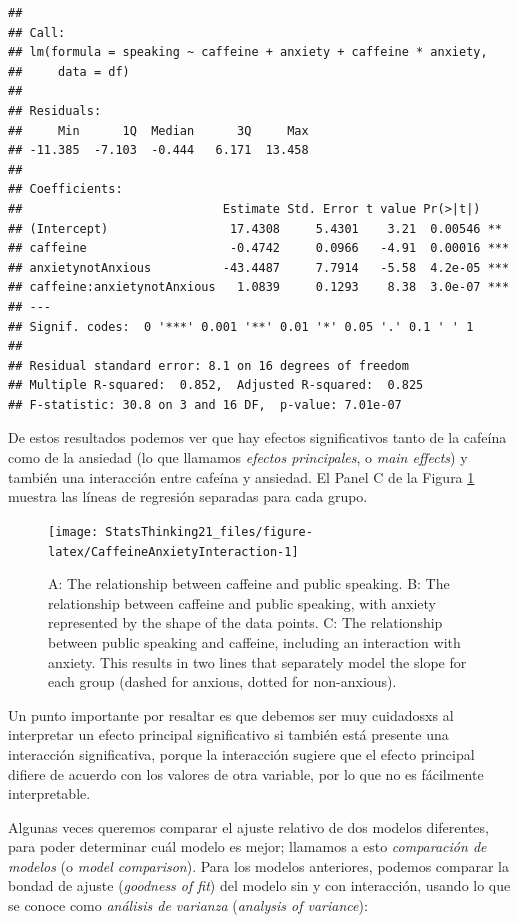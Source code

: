 \documentclass[
  12pt,
]{book}
\begin{document}
\begin{verbatim}
## 
## Call:
## lm(formula = speaking ~ caffeine + anxiety + caffeine * anxiety, 
##     data = df)
## 
## Residuals:
##     Min      1Q  Median      3Q     Max 
## -11.385  -7.103  -0.444   6.171  13.458 
## 
## Coefficients:
##                            Estimate Std. Error t value Pr(>|t|)    
## (Intercept)                 17.4308     5.4301    3.21  0.00546 ** 
## caffeine                    -0.4742     0.0966   -4.91  0.00016 ***
## anxietynotAnxious          -43.4487     7.7914   -5.58  4.2e-05 ***
## caffeine:anxietynotAnxious   1.0839     0.1293    8.38  3.0e-07 ***
## ---
## Signif. codes:  0 '***' 0.001 '**' 0.01 '*' 0.05 '.' 0.1 ' ' 1
## 
## Residual standard error: 8.1 on 16 degrees of freedom
## Multiple R-squared:  0.852,  Adjusted R-squared:  0.825 
## F-statistic: 30.8 on 3 and 16 DF,  p-value: 7.01e-07
\end{verbatim}

De estos resultados podemos ver que hay efectos significativos tanto de la cafeína como de la ansiedad (lo que llamamos \emph{efectos principales}, o \emph{main effects}) y también una interacción entre cafeína y ansiedad. El Panel C de la Figura \ref{fig:CaffeineAnxietyInteraction} muestra las líneas de regresión separadas para cada grupo.

\begin{figure}
\texttt{[image: StatsThinking21\_files/figure-latex/CaffeineAnxietyInteraction-1]} \caption{A: The relationship between caffeine and public speaking. B: The relationship between caffeine and public speaking, with anxiety represented by the shape of the data points. C: The relationship between public speaking and caffeine, including an interaction with anxiety.  This results in two lines that separately model the slope for each group (dashed for anxious, dotted for non-anxious).}\label{fig:CaffeineAnxietyInteraction}
\end{figure}

Un punto importante por resaltar es que debemos ser muy cuidadosxs al interpretar un efecto principal significativo si también está presente una interacción significativa, porque la interacción sugiere que el efecto principal difiere de acuerdo con los valores de otra variable, por lo que no es fácilmente interpretable.

Algunas veces queremos comparar el ajuste relativo de dos modelos diferentes, para poder determinar cuál modelo es mejor; llamamos a esto \emph{comparación de modelos} (o \emph{model comparison}). Para los modelos anteriores, podemos comparar la bondad de ajuste (\emph{goodness of fit}) del modelo sin y con interacción, usando lo que se conoce como \emph{análisis de varianza} (\emph{analysis of variance}):
\end{document}

